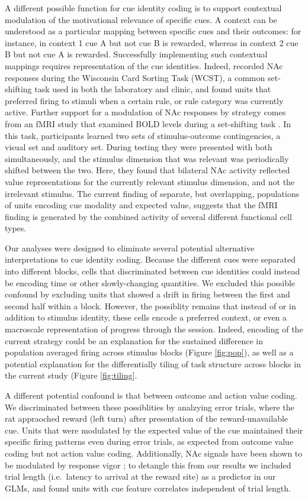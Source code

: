 \documentclass[11pt]{article}
\let\cite=\citep
\begin{document}
{A different possible function for cue identity coding is to support
contextual modulation of the motivational relevance of specific
cues. A context can be understood as a particular mapping between
specific cues and their outcomes: for instance, in context 1 cue A but
not cue B is rewarded, whereas in context 2 cue B but not cue A is
rewarded. Successfully implementing such contextual mappings requires
representation of the cue identities. Indeed, \cite{Sleezer2016}
recorded NAc responses during the Wisconsin Card Sorting Task (WCST),
a common set-shifting task used in both the laboratory and clinic, and
found units that preferred firing to stimuli when a certain rule, or
rule category was currently active. Further support for a
modulation of NAc responses by strategy comes from an fMRI study that
examined BOLD levels during a set-shifting task
\cite{Fitzgerald2014}. In this task, participants learned two sets of
stimulus-outcome contingencies, a visual set and auditory set. During
testing they were presented with both simultaneously, and the stimulus
dimension that was relevant was periodically shifted between the
two. Here, they found that bilateral NAc activity reflected value
representations for the currently relevant stimulus dimension, and not
the irrelevant stimulus. The current finding of separate, but
overlapping, populations of units encoding cue modality and expected
value, suggests that the fMRI finding is generated by the combined
activity of several different functional cell types.

Our analyses were designed to eliminate several potential alternative
interpretations to cue identity coding. Because the different cues
were separated into different blocks, cells that discriminated between
cue identities could instead be encoding time or other slowly-changing
quantities. We excluded this possible confound by excluding units that
showed a drift in firing between the first and second half within a
block. However, the possiblity remains that instead of or in addition
to stimulus identity, these cells encode a preferred context, or even
a macroscale representation of progress through the session. Indeed,
encoding of the current strategy could be an explanation for the
sustained difference in population averaged firing across stimulus
blocks (Figure \ref{fig:pop}), as well as a potential explanation for
the differentially tiling of task structure across blocks in the
current study (Figure \ref{fig:tiling}.

A different potential confound is that between outcome and action
value coding. We discriminated between these possiblities by analzying
error trials, where the rat appraoched reward (left turn) after
presentation of the reward-unavailable cue. Units that were modulated
by the expected value of the cue maintained their specific firing
patterns even during error trials, as expected from outcome value
coding but not action value coding. Additionally, NAc signals have
been shown to be modulated by response vigor \cite{McGinty2013}; to
detangle this from our results we included trial length (i.e.\ latency
to arrival at the reward site) as a predictor in our GLMs, and found
units with cue feature correlates independent of trial length.

}
\end{document}
